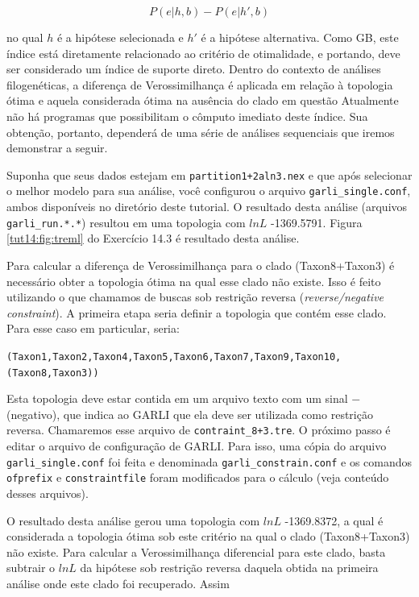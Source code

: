 \begin{refsection}
\begin{center}
\begin{equation}
P(e|h,b) - P(e|h',b)
\end{equation}
\end{center}

no qual $h$ é a hipótese selecionada e $h'$ é a hipótese alternativa. Como GB, este índice está diretamente relacionado ao critério de otimalidade, e portando, deve ser considerado um índice de suporte direto. Dentro do contexto de análises filogenéticas, a diferença de Verossimilhança é aplicada em relação à topologia ótima e aquela considerada ótima na ausência do clado em questão Atualmente não há programas que possibilitam o cômputo imediato deste índice. Sua obtenção, portanto, dependerá de uma série de análises sequenciais que iremos demonstrar a seguir.

Suponha que seus dados estejam em \texttt{partition1+2aln3.nex} e que após selecionar o melhor modelo para sua análise, você configurou o arquivo \texttt{garli\_single.conf}, ambos disponíveis no diretório deste tutorial. O resultado desta análise (arquivos \texttt{garli\_run.*.*}) resultou em uma topologia com $lnL$ -1369.5791. Figura \ref{tut14:fig:treml} do Exercício 14.3 é resultado desta análise.

Para calcular a diferença de Verossimilhança para o clado (Taxon8+Taxon3) é necessário obter a topologia ótima na qual esse clado não existe. Isso é feito utilizando o que chamamos de buscas sob restrição reversa (\textit{reverse/negative constraint}). A primeira etapa seria definir a topologia que contém esse clado. Para esse caso em particular, seria:\\

\begin{center}
\scriptsize\texttt{(Taxon1,Taxon2,Taxon4,Taxon5,Taxon6,Taxon7,Taxon9,Taxon10,(Taxon8,Taxon3))}
\end{center}

Esta topologia deve estar contida em um arquivo texto com um sinal $-$ (negativo), que indica ao GARLI que ela deve ser utilizada como restrição reversa. Chamaremos esse arquivo de \texttt{contraint\_8+3.tre}. O próximo passo é editar o arquivo de configuração de GARLI. Para isso, uma cópia do arquivo \texttt{garli\_single.conf} foi feita e denominada \texttt{garli\_constrain.conf} e os comandos \texttt{ofprefix} e \texttt{constraintfile} foram modificados para o cálculo (veja conteúdo desses arquivos).

O resultado desta análise gerou uma topologia com $lnL$ -1369.8372, a qual é considerada a topologia ótima sob este critério na qual o clado (Taxon8+Taxon3) não existe. Para calcular a Verossimilhança diferencial para este clado, basta subtrair o $lnL$ da hipótese sob restrição reversa daquela obtida na primeira análise onde este clado foi recuperado. Assim


\end{refsection}

